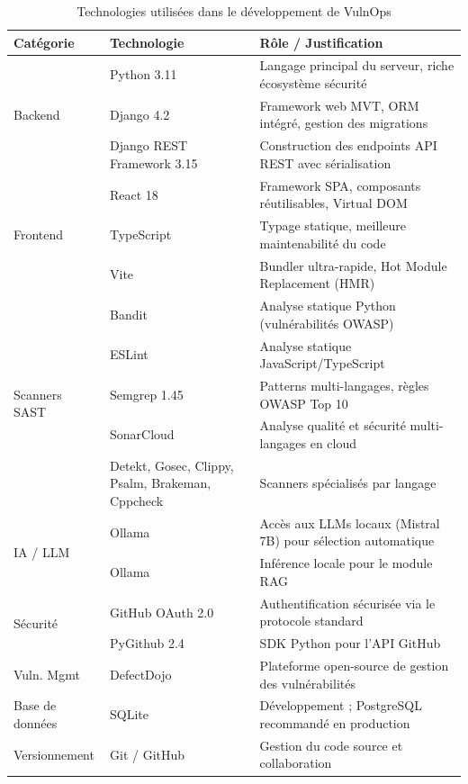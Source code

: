 \documentclass[12pt, a4paper, oneside]{report}
\begin{document}
\begin{table}[H]
    \centering
    \caption{Technologies utilisées dans le développement de VulnOps}
    \label{tab:technologies}
    \begin{tabularx}{\textwidth}{|l|l|X|}
        \hline
        \textbf{Catégorie} & \textbf{Technologie} & \textbf{Rôle / Justification} \\
        \hline
        \multirow{3}{*}{Backend} 
            & Python 3.11 & Langage principal du serveur, riche écosystème sécurité \\
            \cline{2-3}
            & Django 4.2 & Framework web MVT, ORM intégré, gestion des migrations \\
            \cline{2-3}
            & Django REST Framework 3.15 & Construction des endpoints API REST avec sérialisation \\
        \hline
        \multirow{3}{*}{Frontend}
            & React 18 & Framework SPA, composants réutilisables, Virtual DOM \\
            \cline{2-3}
            & TypeScript & Typage statique, meilleure maintenabilité du code \\
            \cline{2-3}
            & Vite & Bundler ultra-rapide, Hot Module Replacement (HMR) \\
        \hline
        \multirow{5}{*}{Scanners SAST}
            & Bandit & Analyse statique Python (vulnérabilités OWASP) \\
            \cline{2-3}
            & ESLint & Analyse statique JavaScript/TypeScript \\
            \cline{2-3}
            & Semgrep 1.45 & Patterns multi-langages, règles OWASP Top 10 \\
            \cline{2-3}
            & SonarCloud & Analyse qualité et sécurité multi-langages en cloud \\
            \cline{2-3}
            & Detekt, Gosec, Clippy, Psalm, Brakeman, Cppcheck & Scanners spécialisés par langage \\
        \hline
        \multirow{2}{*}{IA / LLM}
            & Ollama & Accès aux LLMs locaux (Mistral 7B) pour sélection automatique \\
            \cline{2-3}
            & Ollama & Inférence locale pour le module RAG \\
        \hline
        \multirow{2}{*}{Sécurité}
            & GitHub OAuth 2.0 & Authentification sécurisée via le protocole standard \\
            \cline{2-3}
            & PyGithub 2.4 & SDK Python pour l'API GitHub \\
        \hline
        Vuln. Mgmt & DefectDojo & Plateforme open-source de gestion des vulnérabilités \\
        \hline
        Base de données & SQLite & Développement ; PostgreSQL recommandé en production \\
        \hline
        Versionnement & Git / GitHub & Gestion du code source et collaboration \\
        \hline
    \end{tabularx}
\end{table}
\end{document}
